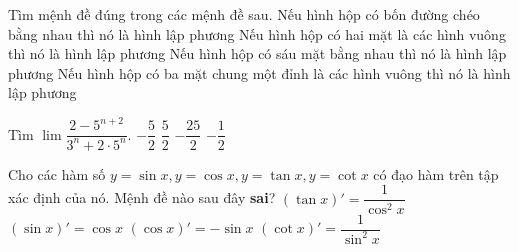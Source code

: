 \begin{ex}%
    Tìm mệnh đề đúng trong các mệnh đề sau.
    \choice
    {Nếu hình hộp có bốn đường chéo bằng nhau thì nó là hình lập phương}
    {Nếu hình hộp có hai mặt là các hình vuông thì nó là hình lập phương}
    {Nếu hình hộp có sáu mặt bằng nhau thì nó là hình lập phương}
    {\True Nếu hình hộp có ba mặt chung một đỉnh là các hình vuông thì nó là hình lập phương}
\end{ex}
\begin{ex}%
    Tìm $\lim \dfrac{2-5^{n+2}}{3^n+2\cdot5^n}$.
    \choice
    {$-\dfrac{5}{2}$}
    {$\dfrac{5}{2}$}
    {\True $-\dfrac{25}{2}$}
    {$-\dfrac{1}{2}$}
\end{ex}
\begin{ex}%
    Cho các hàm số $y=\sin x,y=\cos x,y=\tan x,y=\cot x$ có đạo hàm trên tập xác định của nó. Mệnh đề nào sau đây \textbf{sai}?
    \choice
    {${\left(\tan x\right)}'=\dfrac{1}{\cos^2x}$}
    {${\left(\sin x\right)}'=\cos x$}
    {${\left(\cos x\right)}'=-\sin x$}
    {\True ${\left(\cot x\right)}'=\dfrac{1}{\sin^2x}$}
\end{ex}

